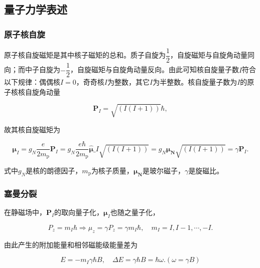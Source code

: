 \subsection{量子力学表述}\label{ux91cfux5b50ux529bux5b66ux8868ux8ff0}

\subsubsection{原子核自旋}\label{ux539fux5b50ux6838ux81eaux65cb}

原子核自旋磁矩是其中核子磁矩的总和。质子自旋为\(\dfrac{1}{2}\)，自旋磁矩与自旋角动量同向；而中子自旋为\(-\dfrac{1}{2}​\)，自旋磁矩与自旋角动量反向。由此可知核自旋量子数\(I​\)符合以下规律：偶偶核\(I=0​\)，奇奇核\(I​\)为整数，其它\(I​\)为半整数。核自旋量子数为\(I​\)的原子核核自旋角动量

\begin{equation}
\boldsymbol{P}_{I} = \sqrt{(I(I+1))}\hbar,
\end{equation}

故其核自旋磁矩为

\begin{equation}
    \boldsymbol{\mu}_{I} = g_N\dfrac{e}{2m_{\text{p}}}\boldsymbol{P}_{I} = g_N\dfrac{e\hbar}{2m_{\text{p}}}\hat{\boldsymbol{\mu}}\_I\sqrt{(I(I+1))} = g_N\boldsymbol{\mu_N}\sqrt{(I(I+1))} = \gamma \boldsymbol{P}_{I}.
\end{equation}

式中\(g_N\)是核的朗德因子，\(m_{\text{p}}\)为核子质量，\(\boldsymbol{\mu_N}\)是玻尔磁子，\(\gamma\)是旋磁比。

\subsubsection{塞曼分裂}\label{ux585eux66fcux5206ux88c2}

在静磁场中，\(\boldsymbol{P}_I\)的取向量子化，\(\boldsymbol{\mu}_I\)也随之量子化，

\begin{equation}
    P_z = m_I\hbar\Rightarrow \mu_z = \gamma P_z=\gamma m_I\hbar,\quad m_I = I,I-1,\cdots,-I.
\end{equation}

由此产生的附加能量和相邻磁能级能量差为

\begin{equation}
    E = -m_I\gamma\hbar B,\quad \Delta E = \gamma\hbar B = \hbar \omega. (\omega = \gamma B)
\end{equation}

